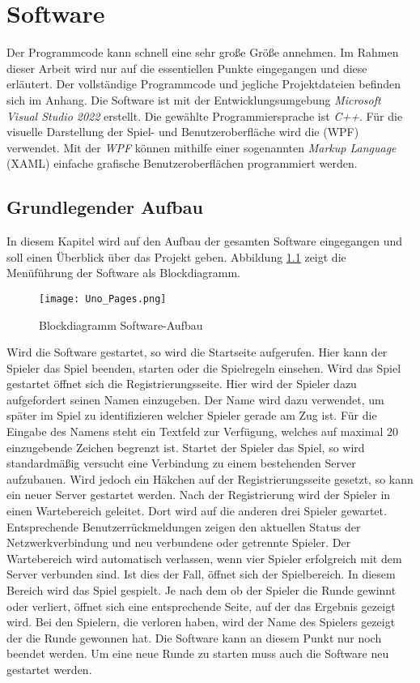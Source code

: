 
\chapter{Software}
Der Programmcode kann schnell eine sehr große Größe annehmen. Im Rahmen dieser Arbeit wird nur auf die essentiellen Punkte eingegangen und diese erläutert. Der vollständige Programmcode und jegliche Projektdateien befinden sich im Anhang. Die Software ist mit der Entwicklungsumgebung \textit{Microsoft Visual Studio 2022} erstellt. Die gewählte Programmiersprache ist \textit{C++}. Für die visuelle Darstellung der Spiel- und Benutzeroberfläche wird die  (WPF) verwendet. Mit der \textit{WPF} können mithilfe einer sogenannten \textit{Markup Language} (XAML) einfache grafische Benutzeroberflächen programmiert werden.
\section{Grundlegender Aufbau}
In diesem Kapitel wird auf den Aufbau der gesamten Software eingegangen und soll einen Überblick über das Projekt geben. Abbildung \ref{fig:aufbau} zeigt die Menüführung der Software als Blockdiagramm. 
\begin{figure}[h]
	\begin{center}
		\texttt{[image: Uno\_Pages.png]}
		\caption{Blockdiagramm Software-Aufbau}
		\label{fig:aufbau}
	\end{center}
\end{figure}
Wird die Software gestartet, so wird die Startseite aufgerufen. Hier kann der Spieler das Spiel beenden, starten oder die Spielregeln einsehen. Wird das Spiel gestartet öffnet sich die Registrierungsseite. Hier wird der Spieler dazu aufgefordert seinen Namen einzugeben. Der Name wird dazu verwendet, um später im Spiel zu identifizieren welcher Spieler gerade am Zug ist. Für die Eingabe des Namens steht ein Textfeld zur Verfügung, welches auf maximal 20 einzugebende Zeichen begrenzt ist. Startet der Spieler das Spiel, so wird standardmäßig versucht eine Verbindung zu einem bestehenden Server aufzubauen. Wird jedoch ein Häkchen auf der Registrierungsseite gesetzt, so kann ein neuer Server gestartet werden. Nach der Registrierung wird der Spieler in einen Wartebereich geleitet. Dort wird auf die anderen drei Spieler gewartet. Entsprechende Benutzerrückmeldungen zeigen den aktuellen Status der Netzwerkverbindung und neu verbundene oder getrennte Spieler. Der Wartebereich wird automatisch verlassen, wenn vier Spieler erfolgreich mit dem Server verbunden sind. Ist dies der Fall, öffnet sich der Spielbereich. In diesem Bereich wird das Spiel gespielt. Je nach dem ob der Spieler die Runde gewinnt oder verliert, öffnet sich eine entsprechende Seite, auf der das Ergebnis gezeigt wird. Bei den Spielern, die verloren haben, wird der Name des Spielers gezeigt der die Runde gewonnen hat. Die Software kann an diesem Punkt nur noch beendet werden. Um eine neue Runde zu starten muss auch die Software neu gestartet werden.
